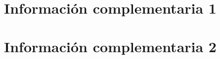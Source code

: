 
\appendix
\section{Información complementaria 1}
\blindtext
\section{Información complementaria 2}
\blindtext
